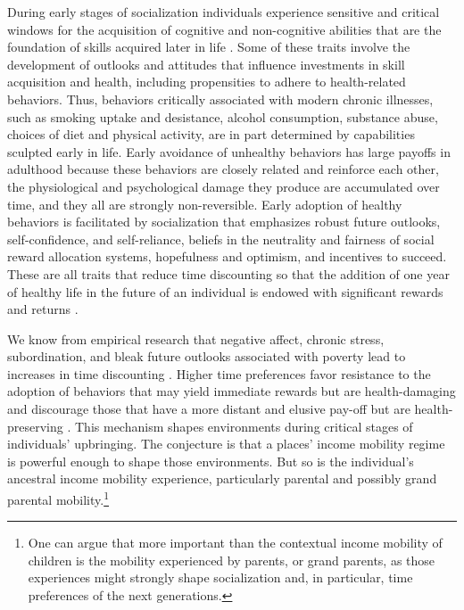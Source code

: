\documentclass[class=article, crop=false, 12pt]{standalone}
\begin{document}
During early stages of socialization individuals experience sensitive and critical windows for the acquisition of cognitive and non-cognitive abilities that are the foundation of skills acquired later in life \citep{knudsen2006, shonkoff2009, heckman2007, cunha2009}. Some of these traits involve the development of outlooks and attitudes that influence investments in skill acquisition and health, including propensities to adhere to health-related behaviors. Thus, behaviors critically associated with modern chronic illnesses, such as smoking uptake and desistance, alcohol consumption, substance abuse, choices of diet and physical activity, are in part determined by capabilities sculpted early in life. Early avoidance of unhealthy behaviors has large payoffs in adulthood because these behaviors are closely related and reinforce each other, the physiological and psychological damage they produce are accumulated over time, and they all are strongly non-reversible. Early adoption of healthy behaviors is facilitated by socialization that emphasizes robust future outlooks, self-confidence, and self-reliance, beliefs in the neutrality and fairness of social reward allocation systems, hopefulness and optimism, and incentives to succeed. These are all traits that reduce time discounting so that the addition of one year of healthy life in the future of an individual is endowed with significant rewards and returns \citep{grossman2000,grossman1972}.

We know from empirical research that negative affect, chronic stress, subordination, and bleak future outlooks associated with poverty lead to increases in time discounting \citep{haushofer2014, schilbach2016}. Higher time preferences favor resistance to the adoption of behaviors that may yield immediate rewards but are health-damaging and discourage those that have a more distant and elusive pay-off but are health-preserving \citep{schlam2013,eigsti2006}. This mechanism shapes environments during critical stages of individuals' upbringing. The conjecture is that a places' income mobility regime is powerful enough to shape those environments. But so is the individual's ancestral income mobility experience, particularly parental and possibly grand parental mobility.\footnote{One can argue that more important than the contextual income mobility of children is the mobility experienced by parents, or grand parents, as those experiences might strongly shape socialization and, in particular, time preferences of the next generations.}
\end{document}
